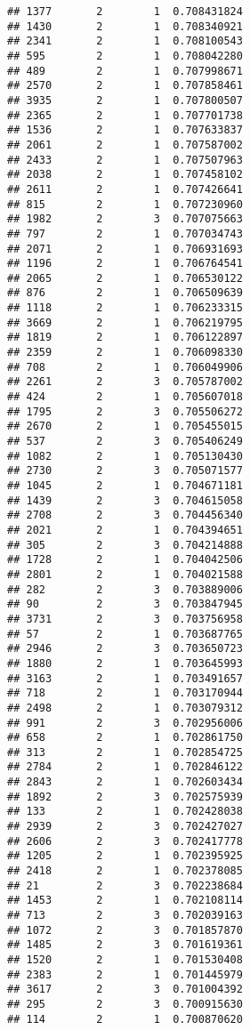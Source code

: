 \documentclass[
]{article}
\begin{document}
\begin{verbatim}
## 1377       2        1  0.708431824
## 1430       2        1  0.708340921
## 2341       2        1  0.708100543
## 595        2        1  0.708042280
## 489        2        1  0.707998671
## 2570       2        1  0.707858461
## 3935       2        1  0.707800507
## 2365       2        1  0.707701738
## 1536       2        1  0.707633837
## 2061       2        1  0.707587002
## 2433       2        1  0.707507963
## 2038       2        1  0.707458102
## 2611       2        1  0.707426641
## 815        2        1  0.707230960
## 1982       2        3  0.707075663
## 797        2        1  0.707034743
## 2071       2        1  0.706931693
## 1196       2        1  0.706764541
## 2065       2        1  0.706530122
## 876        2        1  0.706509639
## 1118       2        1  0.706233315
## 3669       2        1  0.706219795
## 1819       2        1  0.706122897
## 2359       2        1  0.706098330
## 708        2        1  0.706049906
## 2261       2        3  0.705787002
## 424        2        1  0.705607018
## 1795       2        3  0.705506272
## 2670       2        1  0.705455015
## 537        2        3  0.705406249
## 1082       2        1  0.705130430
## 2730       2        3  0.705071577
## 1045       2        1  0.704671181
## 1439       2        3  0.704615058
## 2708       2        3  0.704456340
## 2021       2        1  0.704394651
## 305        2        3  0.704214888
## 1728       2        1  0.704042506
## 2801       2        1  0.704021588
## 282        2        3  0.703889006
## 90         2        3  0.703847945
## 3731       2        3  0.703756958
## 57         2        1  0.703687765
## 2946       2        3  0.703650723
## 1880       2        1  0.703645993
## 3163       2        1  0.703491657
## 718        2        1  0.703170944
## 2498       2        1  0.703079312
## 991        2        3  0.702956006
## 658        2        1  0.702861750
## 313        2        1  0.702854725
## 2784       2        1  0.702846122
## 2843       2        1  0.702603434
## 1892       2        3  0.702575939
## 133        2        1  0.702428038
## 2939       2        3  0.702427027
## 2606       2        3  0.702417778
## 1205       2        1  0.702395925
## 2418       2        1  0.702378085
## 21         2        3  0.702238684
## 1453       2        1  0.702108114
## 713        2        3  0.702039163
## 1072       2        3  0.701857870
## 1485       2        3  0.701619361
## 1520       2        1  0.701530408
## 2383       2        1  0.701445979
## 3617       2        3  0.701004392
## 295        2        3  0.700915630
## 114        2        1  0.700870620

\end{verbatim}
\end{document}
